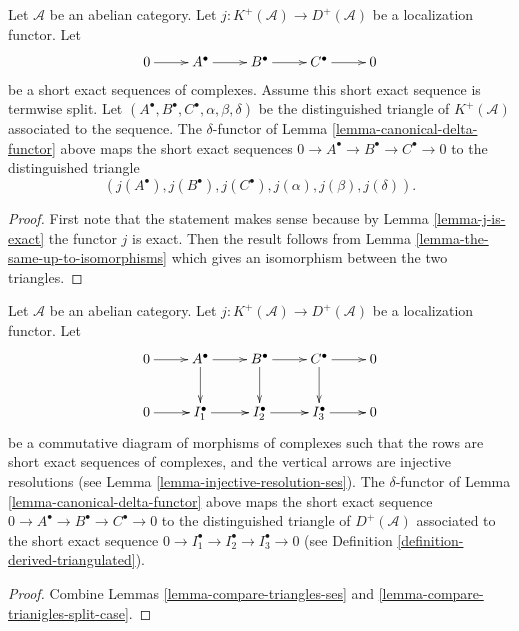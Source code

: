 \begin{lemma}
\label{lemma-compare-trianigles-split-case}
Let $\mathcal{A}$ be an abelian category.
Let $j : K^{+}(\mathcal{A}) \to D^{+}(\mathcal{A})$ be
a localization functor.
Let
$$
\xymatrix{
0 \ar[r] &
A^\bullet \ar[r] &
B^\bullet \ar[r] &
C^\bullet \ar[r] &
0
}
$$
be a short exact sequences of complexes. Assume this short exact sequence
is termwise split. Let
$(A^\bullet, B^\bullet, C^\bullet, \alpha, \beta, \delta)$
be the distinguished triangle of $K^{+}(\mathcal{A})$
associated to the sequence. The $\delta$-functor of
Lemma \ref{lemma-canonical-delta-functor} above
maps the short exact sequences
$0 \to A^\bullet \to B^\bullet \to C^\bullet \to 0$
to the distinguished triangle
$$
(j(A^\bullet), j(B^\bullet), j(C^\bullet), j(\alpha), j(\beta), j(\delta)).
$$
\end{lemma}

\begin{proof}
First note that the statement makes sense because by
Lemma \ref{lemma-j-is-exact} the functor $j$ is exact.
Then the result follows from
Lemma \ref{lemma-the-same-up-to-isomorphisms}
which gives an isomorphism between the two triangles.
\end{proof}

\begin{lemma}
\label{lemma-ses-injective-ses}
Let $\mathcal{A}$ be an abelian category.
Let $j : K^{+}(\mathcal{A}) \to D^{+}(\mathcal{A})$ be
a localization functor.
Let
$$
\xymatrix{
0 \ar[r] &
A^\bullet \ar[r] \ar[d] &
B^\bullet \ar[r] \ar[d] &
C^\bullet \ar[r] \ar[d] &
0 \\
0 \ar[r] &
I_1^\bullet \ar[r] &
I_2^\bullet \ar[r] &
I_3^\bullet \ar[r] &
0
}
$$
be a commutative diagram of morphisms of complexes
such that the rows are short exact sequences of complexes, and
the vertical arrows are injective resolutions
(see Lemma \ref{lemma-injective-resolution-ses}).
The $\delta$-functor of Lemma \ref{lemma-canonical-delta-functor} above
maps the short exact sequence
$0 \to A^\bullet \to B^\bullet \to C^\bullet \to 0$
to the distinguished triangle of $D^{+}(\mathcal{A})$
associated to the short exact sequence
$0 \to I_1^\bullet \to I_2^\bullet \to I_3^\bullet \to 0$
(see Definition \ref{definition-derived-triangulated}).
\end{lemma}

\begin{proof}
Combine Lemmas \ref{lemma-compare-triangles-ses}
and \ref{lemma-compare-trianigles-split-case}.
\end{proof}







